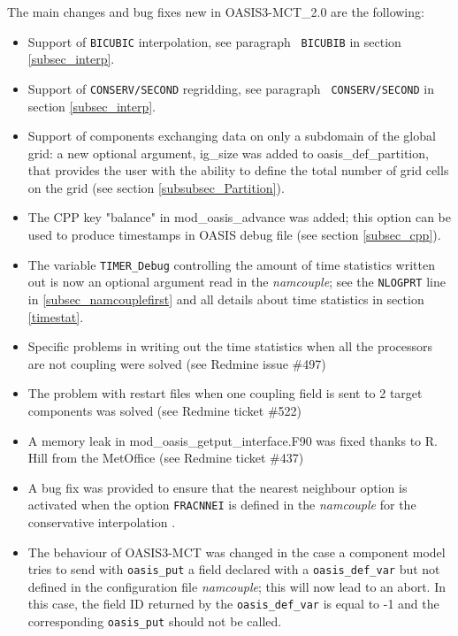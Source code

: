 The main changes and bug fixes new in OASIS3-MCT\_2.0 are the
following:
\begin{itemize}

\item Support of {\tt BICUBIC} interpolation, see paragraph {\tt
    BICUBIB} in section \ref{subsec_interp}.

\item Support of {\tt CONSERV/SECOND} regridding, see paragraph {\tt
    CONSERV/SECOND} in section \ref{subsec_interp}.

\item Support of components exchanging data on only a subdomain of the
  global grid: a new optional argument, ig\_size was added to
  oasis\_def\_partition, that provides the user with the ability to
  define the total number of grid cells on the grid (see section
  \ref{subsubsec_Partition}).

\item The CPP key "balance" in mod\_oasis\_advance was added; this
  option can be used to produce timestamps in OASIS debug file (see
  section \ref{subsec_cpp}).

\item The variable {\tt TIMER\_Debug} controlling the amount of time
  statistics written out is now an optional argument read in the {\it
    namcouple}; see the {\tt NLOGPRT} line in
  \ref{subsec_namcouplefirst} and all details about time statistics in
  section \ref{timestat}.

\item Specific problems in writing out the time statistics when all
  the processors are not coupling were solved (see Redmine issue
  \#497)

\item The problem with restart files when one coupling field is sent
  to 2 target components was solved (see Redmine ticket \#522)

\item A memory leak in mod\_oasis\_getput\_interface.F90 was fixed
  thanks to R. Hill from the MetOffice (see Redmine ticket \#437)

\item A bug fix was provided to ensure that the nearest neighbour
  option is activated when the option {\tt FRACNNEI} is defined in the
  {\it namcouple} for the conservative interpolation .

\item The behaviour of OASIS3-MCT was changed in the case a
  component model tries to send with {\tt oasis\_put} a field declared
  with a {\tt oasis\_def\_var} but not defined in the configuration
  file {\it namcouple}; this will now lead to an abort. In this case,
  the field ID returned by the {\tt oasis\_def\_var} is equal to -1
  and the corresponding {\tt oasis\_put} should not be called.


\end{itemize}
